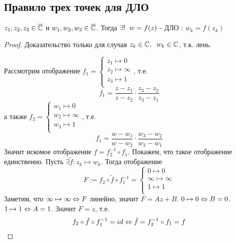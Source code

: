 \subsection{Правило трех точек для ДЛО}
\begin{theorem}
  $z_1,z_2,z_3\in\overline{\mathbb{C}}$ и $w_1,w_2,w_3\in\overline{\mathbb{C}}$. Тогда $\exists!\hspace{0.2cm} w=f(z)$ - ДЛО : $w_k=f(z_k)$ 
\end{theorem}
\begin{proof}
   Доказательство только для случая $z_k\in\mathbb{C},\hspace{0.2cm} w_k\in\mathbb{C}$, т.к. лень.

  Рассмотрим отображение $f_1= 
  \begin{cases}
    z_1\mapsto 0\\
    z_2\mapsto \infty\\
    z_3\mapsto 1\\
  \end{cases}$, т.е.
  \[f_1=\frac{z-z_1}{z-z_2}\cdot \frac{z_3-z_2}{z_3-z_1}\]
  а также $f_2= 
  \begin{cases}
    w_1\mapsto 0\\
    w_2\mapsto \infty\\
    w_3\mapsto 1\\
  \end{cases}$, т.е.
  \[f_1=\frac{w-w_1}{w-w_2}\cdot \frac{w_3-w_2}{w_3-w_1}\]
  Значит искомое отображение $f=f_2^{-1}\circ f_1$. Покажем, что такое отображение единственно. Пусть $\exists \tilde{f}\colon z_k\mapsto w_k$. Тогда отображение
  \[F:=f_2\circ \tilde{f}\circ f_1^{-1} = 
  \begin{cases}
    0\mapsto 0\\
    \infty\mapsto \infty\\
    1\mapsto 1\\
  \end{cases}\]
  Заметим, что $\infty\mapsto \infty\Leftrightarrow F$ линейно, значит $F=Az+B$. $0\mapsto 0\Leftrightarrow B=0$. $1\mapsto 1\Leftrightarrow A=1$. Значит $F=z$, т.е.
  \[f_2\circ \tilde{f}\circ f_1^{-1}=id\Leftrightarrow \tilde{f} = f_2^{-1}\circ f_1=f\]
\end{proof}

